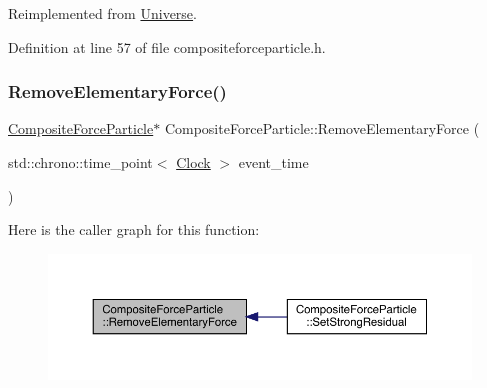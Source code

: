 Reimplemented from \hyperlink{class_universe_a645299738e6b798a037f2a15a2e7cf4d}{Universe}.



Definition at line 57 of file compositeforceparticle.\+h.

\mbox{\label{class_composite_force_particle_afe5738b3ba1382dad085fa1ef39963b3}} 
\subsubsection{\texorpdfstring{Remove\+Elementary\+Force()}{RemoveElementaryForce()}}
{\footnotesize\ttfamily \hyperlink{class_composite_force_particle}{Composite\+Force\+Particle}$\ast$ Composite\+Force\+Particle\+::\+Remove\+Elementary\+Force (\begin{DoxyParamCaption}\item[{std\+::chrono\+::time\+\_\+point$<$ \hyperlink{universe_8h_a0ef8d951d1ca5ab3cfaf7ab4c7a6fd80}{Clock} $>$}]{event\+\_\+time }\end{DoxyParamCaption})}

Here is the caller graph for this function\+:\nopagebreak
\begin{figure}[H]
\begin{center}
\leavevmode
\includegraphics[width=350pt]{class_composite_force_particle_afe5738b3ba1382dad085fa1ef39963b3_icgraph}
\end{center}
\end{figure}
\mbox{\label{class_composite_force_particle_a1bfa61cec4f5a8436c1a188312ba8f45}} 
